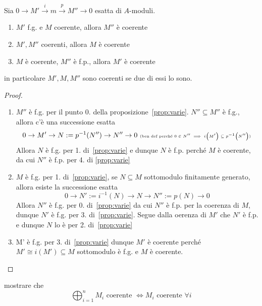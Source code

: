 \begin{proposition}{}
    Sia \(0 \to M' \overset{i}{\to } m \overset{p}{\to } M'' \to 0\) esatta di
    \(A\)-moduli.
\begin{enumerate}[label = \arabic*.]
    \item \(M'\) f.g. e \(M\) coerente, allora \(M''\) è coerente
    \item \(M', M''\) coerenti, allora \(M\) è coerente
    \item \(M\) è coerente, \(M''\) è f.p., allora \(M'\) è coerente
\end{enumerate}
in particolare \(M', M, M''\) sono coerenti se due di essi lo sono.
\end{proposition}
\begin{proof}{}
\begin{enumerate}[label = \arabic*.]
    \item \(M''\) è f.g. per il punto 0. della proposizione~\ref{prop:varie}.
        \(N'' \subseteq M'' \)  è f.g., allora c'è una successione esatta
        \[
          0 \to M' \to N := p^{-1}{(N'')} \to N'' \to 0 \text{ \tiny (ben def
          perché \(0 \in N'' \implies i{\left( M' \right)}  \subseteq p^{-1}{\left(N''\right)} \))}
        \]
        Allora \(N\) è f.g. per 1. di~\ref{prop:varie} e dunque \(N\) è f.p.
        perché \(M\) è coerente, da cui \(N''\) è f.p. per 4. di \ref{prop:varie}
    \item \(M\) è f.g. per 1. di~\ref{prop:varie}, se \(N \subseteq M \)
        sottomodulo finitamente generato, allora esiste la successione esatta
        \[
          0 \to N' := i^{-1}{(N)} \to N \to N'' := p{(N)} \to 0
        \]
        Allora \(N''\) è f.g. per 0. di~\ref{prop:varie} da cui \(N''\) è f.p.
        per la coerenza di \(M\), dunque \(N'\) è f.g. per 3. di~\ref{prop:varie}. Segue dalla oerenza di \(M'\) che \(N'\) è f.p. e dunque \(N\) lo è per 2. di~\ref{prop:varie}
    \item M' è f.g. per 3. di~\ref{prop:varie} dunque \(M'\) è coerente perché
        \(M' \cong i{(M')} \subseteq M \) sottomodulo è f.g. e \(M\) è coerente.
\end{enumerate}
\end{proof}
\begin{eser}{}
    mostrare che
    \[
      \bigoplus_{i=1} ^{n} M_i \text{ coerente } \iff M_{i} \text{ coerente } \forall i
    \]
\end{eser}

